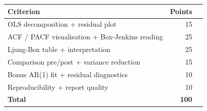 \documentclass[a4paper,11pt]{article}
\begin{document}
\begin{center}
\begin{tabular}{p{8cm}rl}
\toprule
\textbf{Criterion} & \textbf{Points} & \\
\midrule
OLS decomposition + residual plot                & 15 \\
ACF / PACF visualisation + Box-Jenkins reading   & 25 \\
Ljung-Box table + interpretation                 & 25 \\
Comparison pre/post + variance reduction         & 15 \\
Bonus AR(1) fit + residual diagnostics           & 10 \\
Reproducibility + report quality                 & 10 \\
\midrule
\textbf{Total}                                   & \textbf{100} \\
\bottomrule
\end{tabular}
\end{center}

\bigskip
\hfill\auteurNom\par
\hfill\auteurEmail\par
\end{document}
